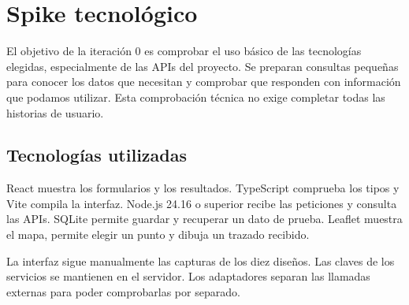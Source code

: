 \documentclass[11pt,a4paper]{article}
\begin{document}





\clearpage
\section{Spike tecnológico}\label{sec6}
El objetivo de la iteración 0 es comprobar el uso básico de las tecnologías elegidas, especialmente de las APIs del proyecto. Se preparan consultas pequeñas para conocer los datos que necesitan y comprobar que responden con información que podamos utilizar. Esta comprobación técnica no exige completar todas las historias de usuario.\par
\subsection*{Tecnologías utilizadas}
React muestra los formularios y los resultados. TypeScript comprueba los tipos y Vite compila la interfaz. Node.js 24.16 o superior recibe las peticiones y consulta las APIs. SQLite permite guardar y recuperar un dato de prueba. Leaflet muestra el mapa, permite elegir un punto y dibuja un trazado recibido.\par
La interfaz sigue manualmente las capturas de los diez diseños. Las claves de los servicios se mantienen en el servidor. Los adaptadores separan las llamadas externas para poder comprobarlas por separado.\par
\end{document}
